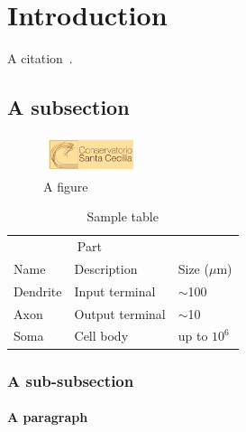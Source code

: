 \section{Introduction}
\label{sec:introduction}

A citation~\cite{Hasselmo5249}. 
\lipsum[1-3]

\subsection{A subsection}
\label{sec:asubsection}

\lipsum[1-2]

\begin{figure}
    \centering
    \includegraphics[width=0.25\textwidth]{figures/unito-logo.png}
    \caption{A figure}
    \label{fig:figure}
\end{figure}

\lipsum[3-4]

\begin{table}
  \caption{Sample table}
  \label{sample-table}
  \centering
  \begin{tabular}{lll}
    \toprule
    \multicolumn{2}{c}{Part}                   \\
    \cmidrule(r){1-2}
    Name     & Description     & Size ($\mu$m) \\
    \midrule
    Dendrite & Input terminal  & $\sim$100     \\
    Axon     & Output terminal & $\sim$10      \\
    Soma     & Cell body       & up to $10^6$  \\
    \bottomrule
  \end{tabular}
\end{table}

\subsubsection{A sub-subsection}

\lipsum[5]

\paragraph{A paragraph} \lipsum[6]